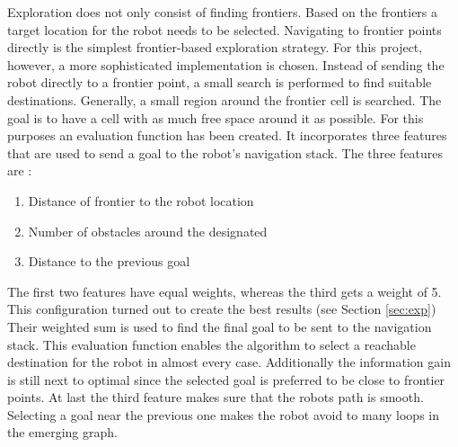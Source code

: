 \documentclass{ba-kecs}
\begin{document}
Exploration does not only consist of finding frontiers. Based on the frontiers a target location for the robot needs to be selected. Navigating to frontier points directly is the simplest frontier-based exploration strategy. For this project, however, a more sophisticated implementation is chosen. Instead of sending the robot directly to a frontier point, a small search is performed to find suitable destinations. Generally, a small region around the frontier cell is searched. The goal is to have a cell with as much free space around it as possible. For this purposes an evaluation function has been created. It incorporates three features that are used to send a goal to the robot's navigation stack. The three features are :
\begin{enumerate}
\item{Distance of frontier to the robot location}
\item{Number of obstacles around the designated} \item{Distance to the previous goal}
\end{enumerate}
 The first two features have equal weights, whereas the third gets a weight of 5. This configuration turned out to create the best results (see Section \ref{sec:exp}) Their weighted sum is used to find the final goal to be sent to the navigation stack. This evaluation function enables the algorithm to select a reachable destination for the robot in almost every case. Additionally the information gain is still next to optimal since the selected goal is preferred to be close to frontier points. At last the third feature makes sure that the robots path is smooth. Selecting a goal near the previous one makes the robot avoid to many loops in the emerging graph.
\end{document}
